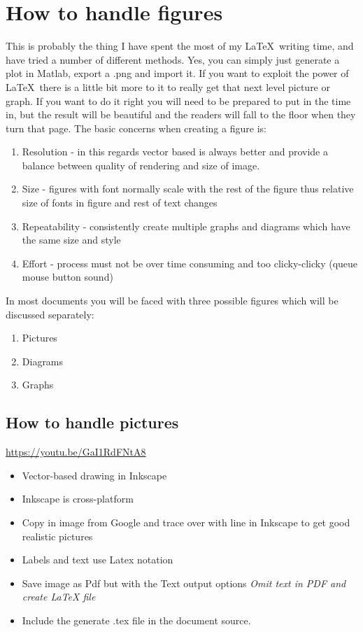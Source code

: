 \documentclass[12pt]{article}
\begin{document}
\section*{How to handle figures}
This is probably the thing I have spent the most of my \LaTeX~writing time, and have tried a number of different methods.
Yes, you can simply just generate a plot in Matlab, export a .png and import it.
If you want to exploit the power of \LaTeX~there is a little bit more to it to really get that next level picture or graph.
If you want to do it right you will need to be prepared to put in the time in, but the result will be beautiful and the readers will fall to the floor when they turn that page.
The basic concerns when creating a figure is:
\begin{enumerate}
	\item Resolution - in this regards vector based is always better and provide a balance between quality of rendering and size of image.
	\item Size - figures with font normally scale with the rest of the figure thus relative size of fonts in figure and rest of text changes
	\item Repeatability - consistently create multiple graphs and diagrams which have the same size and style
	\item Effort - process must not be over time consuming and too clicky-clicky (queue mouse button sound)
\end{enumerate}
In most documents you will be faced with three possible figures which will be discussed separately:
\begin{enumerate}
	\item Pictures
	\item Diagrams
	\item Graphs
\end{enumerate}

\subsection*{How to handle pictures}
\url{https://youtu.be/GaI1RdFNtA8}
\begin{itemize}
	\item Vector-based drawing in Inkscape
	\item Inkscape is cross-platform
	\item Copy in image from Google and trace over with line in Inkscape to get good realistic pictures
	\item Labels and text use Latex notation
	\item Save image as Pdf but with the Text output options \textit{Omit text in PDF and create LaTeX file}
	\item Include the generate .tex file in the document source. 
\end{itemize}
\end{document}
